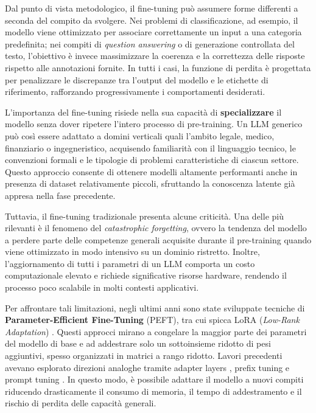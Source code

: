 Dal punto di vista metodologico, il fine-tuning può assumere forme differenti a seconda del compito da svolgere. Nei problemi di classificazione, ad esempio, il modello viene ottimizzato per associare correttamente un input a una categoria predefinita; nei compiti di \textit{question answering} o di generazione controllata del testo, l’obiettivo è invece massimizzare la coerenza e la correttezza delle risposte rispetto alle annotazioni fornite. In tutti i casi, la funzione di perdita è progettata per penalizzare le discrepanze tra l’output del modello e le etichette di riferimento, rafforzando progressivamente i comportamenti desiderati.

L’importanza del fine-tuning risiede nella sua capacità di \textbf{specializzare} il modello senza dover ripetere l’intero processo di pre-training. Un LLM generico può così essere adattato a domini verticali quali l’ambito legale, medico, finanziario o ingegneristico, acquisendo familiarità con il linguaggio tecnico, le convenzioni formali e le tipologie di problemi caratteristiche di ciascun settore. Questo approccio consente di ottenere modelli altamente performanti anche in presenza di dataset relativamente piccoli, sfruttando la conoscenza latente già appresa nella fase precedente.

Tuttavia, il fine-tuning tradizionale presenta alcune criticità. Una delle più rilevanti è il fenomeno del \textit{catastrophic forgetting}, ovvero la tendenza del modello a perdere parte delle competenze generali acquisite durante il pre-training quando viene ottimizzato in modo intensivo su un dominio ristretto. Inoltre, l’aggiornamento di tutti i parametri di un LLM comporta un costo computazionale elevato e richiede significative risorse hardware, rendendo il processo poco scalabile in molti contesti applicativi.

Per affrontare tali limitazioni, negli ultimi anni sono state sviluppate tecniche di \textbf{Parameter-Efficient Fine-Tuning} (PEFT), tra cui spicca LoRA (\textit{Low-Rank Adaptation}) \cite{hu2021lora}. Questi approcci mirano a congelare la maggior parte dei parametri del modello di base e ad addestrare solo un sottoinsieme ridotto di pesi aggiuntivi, spesso organizzati in matrici a rango ridotto. Lavori precedenti avevano esplorato direzioni analoghe tramite adapter layers \cite{houlsby2019parameter}, prefix tuning \cite{li2021prefix} e prompt tuning \cite{lester2021power}. In questo modo, è possibile adattare il modello a nuovi compiti riducendo drasticamente il consumo di memoria, il tempo di addestramento e il rischio di perdita delle capacità generali.

